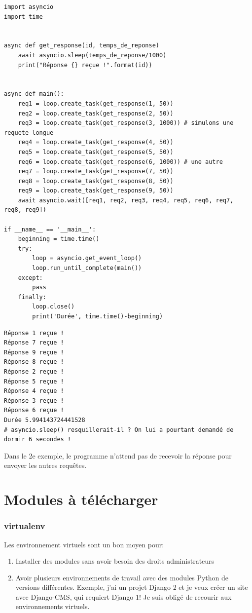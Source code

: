 \documentclass[a4paper, 10pt]{article}
\begin{document}
\begin{verbatim}
import asyncio
import time


async def get_response(id, temps_de_reponse)
    await asyncio.sleep(temps_de_reponse/1000)
    print("Réponse {} reçue !".format(id))


async def main():
    req1 = loop.create_task(get_response(1, 50))
    req2 = loop.create_task(get_response(2, 50))
    req3 = loop.create_task(get_response(3, 1000)) # simulons une requete longue
    req4 = loop.create_task(get_response(4, 50))
    req5 = loop.create_task(get_response(5, 50))
    req6 = loop.create_task(get_response(6, 1000)) # une autre
    req7 = loop.create_task(get_response(7, 50))
    req8 = loop.create_task(get_response(8, 50))
    req9 = loop.create_task(get_response(9, 50))
    await asyncio.wait([req1, req2, req3, req4, req5, req6, req7, req8, req9])

if __name__ == '__main__':
    beginning = time.time()
    try:
        loop = asyncio.get_event_loop()
        loop.run_until_complete(main())
    except:
        pass
    finally:
        loop.close()
        print('Durée', time.time()-beginning)

\end{verbatim}
\begin{verbatim}
Réponse 1 reçue !
Réponse 7 reçue !
Réponse 9 reçue !
Réponse 8 reçue !
Réponse 2 reçue !
Réponse 5 reçue !
Réponse 4 reçue !
Réponse 3 reçue !
Réponse 6 reçue !
Durée 5.994143724441528
# asyncio.sleep() resquillerait-il ? On lui a pourtant demandé de dormir 6 secondes !
\end{verbatim}
Dans le 2e exemple, le programme n'attend pas de recevoir la réponse pour envoyer les autres requêtes.

\part{Modules à télécharger}
\section{virtualenv}\label{virtualenv}

Les environnement virtuels  sont un bon moyen pour:
\begin{enumerate}
    \item Installer des modules sans avoir besoin des droits administrateurs
    \item Avoir plusieurs environnements de travail avec des modules Python de versions différentes. Exemple, j'ai un projet Django 2 et je veux créer un site avec Django-CMS, qui requiert Django 1! Je suis obligé de recourir aux environnements virtuels.
\end{enumerate}
\end{document}
